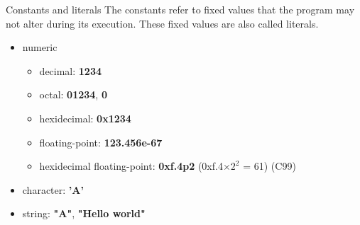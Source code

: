 \begin{frame}{Constants and literals}
    The constants refer to fixed values that the program may not alter during its execution. These fixed values are also called literals.
    \begin{itemize}
        \item numeric
            \begin{itemize}
                \item decimal: \textbf{1234}
                \item octal: \textbf{01234}, \textbf{0}
                \item hexidecimal: \textbf{0x1234}
                \item floating-point: \textbf{123.456e-67}
                \item hexidecimal floating-point: \textbf{0xf.4p2} (0xf.4$\times{2}^2$ = 61) (C99)
            \end{itemize}
        \item character: \textbf{'A'}
        \item string: \textbf{"A"}, \textbf{"Hello world"}
    \end{itemize}
\end{frame}
